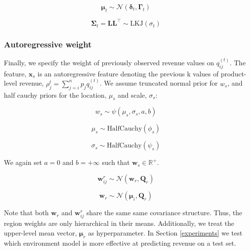 \begin{equation}
    \boldsymbol{\mu}_t \sim \mathcal{N}(\boldsymbol{\delta}_t, \boldsymbol{\Gamma}_t)
\end{equation}

\begin{equation}
    \boldsymbol{\Sigma}_t = \textbf{L}\textbf{L}^{\top} \sim \text{LKJ}(\sigma_t)
\end{equation}



\subsubsection{Autoregressive weight}
Finally, we specify the weight of previously observed revenue values on $q_{ij}^{(t)}$. The feature, $\textbf{x}_s$ is an autoregressive feature denoting the previous k values of product-level revenue, $\rho_j^{t} =  \sum_{j=i}^n p_j q_{ij}^{(t)}$. We assume truncated normal prior for $w_s$, and half cauchy priors for the location, $\mu_s$ and scale, $\sigma_s$:

\begin{equation}
    w_s \sim  \psi(\mu_s, \sigma_s, a, b)
\end{equation}

\begin{equation}
    \mu_s \sim \text{HalfCauchy}(\phi_s)
\end{equation}

\begin{equation}
    \sigma_s \sim \text{HalfCauchy}(\psi_s)
\end{equation}


We again set $a = 0$ and $b=+\infty$ such that $\textbf{w}_s \in \mathbb{R}^{+}$. 




\begin{equation}\label{heterogenous-w-r}
    \textbf{w}_{ij}^r \sim \mathcal{N}(\textbf{w}_r, \textbf{Q}_r)
\end{equation}

\begin{equation}
    \textbf{w}_r \sim \mathcal{N}(\boldsymbol{\mu}_i, \textbf{Q}_r)
\end{equation}

Note that both $\textbf{w}_r$ and $\textbf{w}_{ij}^r$ share the same same covariance structure. Thus, the region weights are only hierarchical in their means. Additionally, we treat the upper-level mean vector, $\boldsymbol{\mu}_r$ as hyperparameter. In Section \ref{experiments} we test which environment model is more effective at predicting revenue on a test set.


